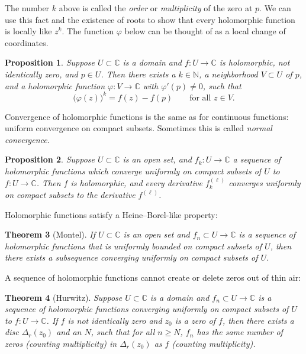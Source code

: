 \documentclass[12pt,openany]{book}
\newcommand{\C}{{\mathbb{C}}}
\newcommand{\N}{{\mathbb{N}}}
\newcommand{\myindex}[1]{#1\index{#1}}
\theoremstyle{plain}
\newtheorem{thm}{Theorem}[section]
\newtheorem{prop}[thm]{Proposition}
\theoremstyle{remark}
\theoremstyle{definition}
\theoremstyle{exercise}
\theoremstyle{example}
\begin{document}
The number $k$ above is called the \emph{order}
or \emph{multiplicity}
of the zero at $p$.
We can use this fact and the existence of roots to show that every
holomorphic function is locally like $z^k$.  The function $\varphi$
below can be thought of as a local change of coordinates.

\begin{prop}
Suppose $U \subset \C$ is a domain and
$f \colon U \to \C$ is holomorphic, not identically zero, and $p \in U$.
Then there exists a $k \in \N$,
a neighborhood $V \subset U$ of $p$,  and
a holomorphic function $\varphi \colon V \to \C$ with 
$\varphi'(p) \not= 0$, such that
\begin{equation*}
{\bigl(\varphi(z)\bigr)}^k = f(z) - f(p)
\qquad \text{for all $z \in V$.}
\end{equation*}
\end{prop}

Convergence of holomorphic functions is the same as for continuous
functions: uniform convergence on compact subsets.
Sometimes this is called \emph{\myindex{normal convergence}}.

\begin{prop}
Suppose $U \subset \C$ is an open set, and $f_k \colon U \to \C$
a sequence of holomorphic functions which converge uniformly
on compact subsets of $U$ to $f \colon U \to \C$.  Then $f$ is holomorphic,
and every derivative $f_k^{(\ell)}$ converges uniformly on compact subsets
to the derivative $f^{(\ell)}$.
\end{prop}

Holomorphic functions satisfy a Heine--Borel-like property:

\begin{thm}[Montel]\label{thm:onevarmontel}
If $U \subset \C$ is an open set and
$f_n \subset U \to \C$ is a sequence of holomorphic functions
that is uniformly bounded on compact subsets of $U$,
then there exists a subsequence converging uniformly on compact subsets
of $U$.
\end{thm}

A sequence of holomorphic functions cannot create or delete zeros out of thin air:

\begin{thm}[Hurwitz]\label{thm:onevarhurwitz}
Suppose $U \subset \C$ is a domain and
$f_n \subset U \to \C$ is a sequence of holomorphic functions
converging uniformly on compact subsets of $U$ to $f \colon U \to \C$.
If $f$ is not identically zero and $z_0$ is a zero of $f$,
then there exists a disc $\Delta_r(z_0)$ and an $N$, such that
for all $n \geq N$, $f_n$ has the same number of zeros (counting
multiplicity) in $\Delta_r(z_0)$ as $f$ (counting multiplicity).
\end{thm}
\end{document}

